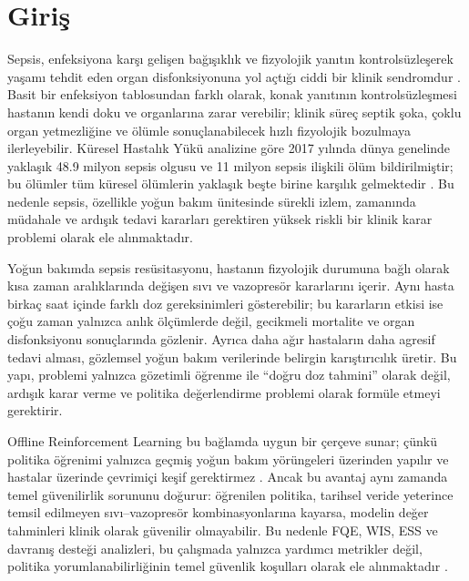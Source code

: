 \documentclass[conference]{IEEEtran}
\begin{document}
\section{Giriş}
Sepsis, enfeksiyona karşı gelişen bağışıklık ve fizyolojik yanıtın kontrolsüzleşerek yaşamı tehdit eden organ disfonksiyonuna yol açtığı ciddi bir klinik sendromdur \cite{singer2016sepsis3}. Basit bir enfeksiyon tablosundan farklı olarak, konak yanıtının kontrolsüzleşmesi hastanın kendi doku ve organlarına zarar verebilir; klinik süreç septik şoka, çoklu organ yetmezliğine ve ölümle sonuçlanabilecek hızlı fizyolojik bozulmaya ilerleyebilir. Küresel Hastalık Yükü analizine göre 2017 yılında dünya genelinde yaklaşık 48.9 milyon sepsis olgusu ve 11 milyon sepsis ilişkili ölüm bildirilmiştir; bu ölümler tüm küresel ölümlerin yaklaşık beşte birine karşılık gelmektedir \cite{who2020sepsis}. Bu nedenle sepsis, özellikle yoğun bakım ünitesinde sürekli izlem, zamanında müdahale ve ardışık tedavi kararları gerektiren yüksek riskli bir klinik karar problemi olarak ele alınmaktadır.

Yoğun bakımda sepsis resüsitasyonu, hastanın fizyolojik durumuna bağlı olarak kısa zaman aralıklarında değişen sıvı ve vazopresör kararlarını içerir. Aynı hasta birkaç saat içinde farklı doz gereksinimleri gösterebilir; bu kararların etkisi ise çoğu zaman yalnızca anlık ölçümlerde değil, gecikmeli mortalite ve organ disfonksiyonu sonuçlarında gözlenir. Ayrıca daha ağır hastaların daha agresif tedavi alması, gözlemsel yoğun bakım verilerinde belirgin karıştırıcılık üretir. Bu yapı, problemi yalnızca gözetimli öğrenme ile ``doğru doz tahmini'' olarak değil, ardışık karar verme ve politika değerlendirme problemi olarak formüle etmeyi gerektirir.

Offline Reinforcement Learning bu bağlamda uygun bir çerçeve sunar; çünkü politika öğrenimi yalnızca geçmiş yoğun bakım yörüngeleri üzerinden yapılır ve hastalar üzerinde çevrimiçi keşif gerektirmez \cite{levine2020offline}. Ancak bu avantaj aynı zamanda temel güvenilirlik sorununu doğurur: öğrenilen politika, tarihsel veride yeterince temsil edilmeyen sıvı--vazopresör kombinasyonlarına kayarsa, modelin değer tahminleri klinik olarak güvenilir olmayabilir. Bu nedenle FQE, WIS, ESS ve davranış desteği analizleri, bu çalışmada yalnızca yardımcı metrikler değil, politika yorumlanabilirliğinin temel güvenlik koşulları olarak ele alınmaktadır \cite{voloshin2021ope}.
\end{document}
